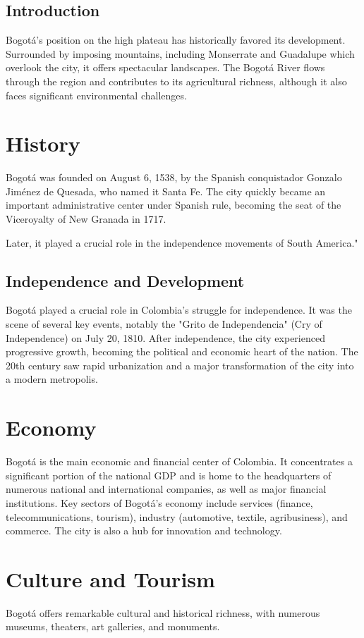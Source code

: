 \documentclass{article}
\begin{document}
\subsection{Introduction}
Bogotá's position on the high plateau has historically favored its development. Surrounded by imposing mountains, including Monserrate and Guadalupe which overlook the city, it offers spectacular landscapes. The Bogotá River flows through the region and contributes to its agricultural richness, although it also faces significant environmental challenges.

\section{History}
Bogotá was founded on August 6, 1538, by the Spanish conquistador Gonzalo Jiménez de Quesada, who named it Santa Fe. The city quickly became an important administrative center under Spanish rule, becoming the seat of the Viceroyalty of New Granada in 1717.

Later, it played a crucial role in the independence movements of South America."

\subsection{Independence and Development}
Bogotá played a crucial role in Colombia's struggle for independence. It was the scene of several key events, notably the "Grito de Independencia" (Cry of Independence) on July 20, 1810. After independence, the city experienced progressive growth, becoming the political and economic heart of the nation. The 20th century saw rapid urbanization and a major transformation of the city into a modern metropolis.

\section{Economy}
Bogotá is the main economic and financial center of Colombia. It concentrates a significant portion of the national GDP and is home to the headquarters of numerous national and international companies, as well as major financial institutions. Key sectors of Bogotá's economy include services (finance, telecommunications, tourism), industry (automotive, textile, agribusiness), and commerce. The city is also a hub for innovation and technology.

\section{Culture and Tourism}
Bogotá offers remarkable cultural and historical richness, with numerous museums, theaters, art galleries, and monuments.
\end{document}
